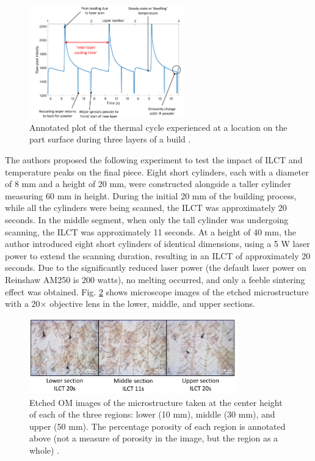 \begin{figure}
    \centering
    \includegraphics[width=0.6\textwidth]{Images/temperature profile.png}
    \caption[Temperature profile.]{Annotated plot of the thermal cycle experienced at a location on the part surface during three layers of a build \cite{williams_situ_2019}.}
    \label{fig:temperatureprofile}
\end{figure}
The authors proposed the following experiment to test the impact of ILCT and temperature peaks on the final piece. Eight short cylinders, each with a diameter of 8 mm and a height of 20 mm, were constructed alongside a taller cylinder measuring 60 mm in height. During the initial 20 mm of the building process, while all the cylinders were being scanned, the ILCT was approximately 20 seconds. In the middle segment, when only the tall cylinder was undergoing scanning, the ILCT was approximately 11 seconds. At a height of 40 mm, the author introduced eight short cylinders of identical dimensions, using a 5 W laser power to extend the scanning duration, resulting in an ILCT of approximately 20 seconds. Due to the significantly reduced laser power (the default laser power on Reinshaw AM250 is 200 watts), no melting occurred, and only a feeble sintering effect was obtained. Fig. \ref{fig:williamporosities} shows microscope images of the etched microstructure with a 20$\times$ objective lens in the lower, middle, and upper sections.
\begin{figure}
    \centering
    \includegraphics[width=0.8\textwidth]{Images/differntisezioni.png}
    \caption[Microstructure of reference cylinder.]{Etched OM images of the microstructure taken at the center height of each of the three regions: lower (10 mm), middle (30 mm), and upper (50 mm). The percentage porosity of each region is annotated above (not a measure of porosity in the image, but the region as a whole) \cite{williams_situ_2019}.}
    \label{fig:williamporosities}
\end{figure}
